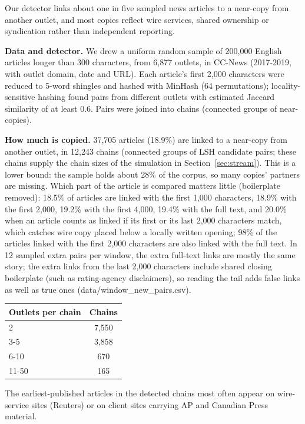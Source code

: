 Our detector links about one in five sampled news articles to a near-copy from another outlet, and most copies reflect wire services, shared ownership or syndication rather than independent reporting.

\textbf{Data and detector.} We drew a uniform random sample of 200,000 English articles longer than 300 characters, from 6,877 outlets, in CC-News (2017-2019, with outlet domain, date and URL). Each article's first 2,000 characters were reduced to 5-word shingles and hashed with MinHash (64 permutations); locality-sensitive hashing found pairs from different outlets with estimated Jaccard similarity of at least 0.6. Pairs were joined into chains (connected groups of near-copies).

\textbf{How much is copied.} 37,705 articles (18.9\%) are linked to a near-copy from another outlet, in 12,243 chains (connected groups of LSH candidate pairs; these chains supply the chain sizes of the simulation in Section~\ref{sec:stream}). This is a lower bound: the sample holds about 28\% of the corpus, so many copies' partners are missing. Which part of the article is compared matters little (boilerplate removed): 18.5\% of articles are linked with the first 1,000 characters, 18.9\% with the first 2,000, 19.2\% with the first 4,000, 19.4\% with the full text, and 20.0\% when an article counts as linked if its first or its last 2,000 characters match, which catches wire copy placed below a locally written opening; 98\% of the articles linked with the first 2,000 characters are also linked with the full text. In 12 sampled extra pairs per window, the extra full-text links are mostly the same story; the extra links from the last 2,000 characters include shared closing boilerplate (such as rating-agency disclaimers), so reading the tail adds false links as well as true ones (data/window\_new\_pairs.csv).

\begin{table}[htbp]\centering\small
\begin{tabular}{lc}
\toprule
Outlets per chain & Chains \\
\midrule
2 & 7,550 \\
3-5 & 3,858 \\
6-10 & 670 \\
11-50 & 165 \\
\bottomrule
\end{tabular}
\end{table}

The earliest-published articles in the detected chains most often appear on wire-service sites (Reuters) or on client sites carrying AP and Canadian Press material.

